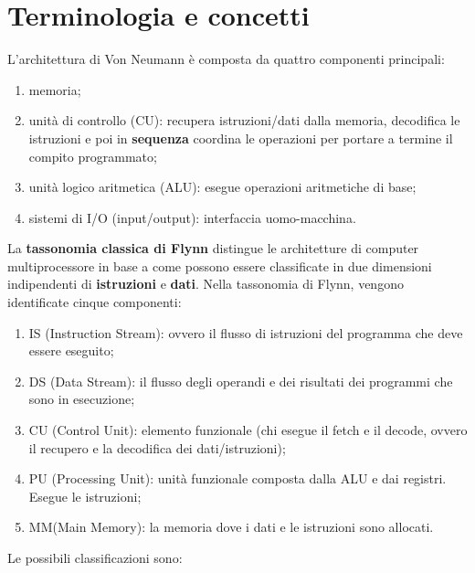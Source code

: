 \section{Terminologia e concetti}
L'architettura di Von Neumann è composta da quattro componenti principali:
\begin{enumerate}
	\item memoria;
	\item unità di controllo (CU): recupera istruzioni/dati dalla memoria, decodifica le istruzioni e poi in \textbf{sequenza} coordina le operazioni per portare a termine il compito programmato;
	\item unità logico aritmetica (ALU): esegue operazioni aritmetiche di base;
	\item sistemi di I/O (input/output): interfaccia uomo-macchina.
\end{enumerate}
La \textbf{tassonomia classica di Flynn} distingue le architetture di computer multiprocessore in base a come possono essere classificate in due dimensioni indipendenti di \textbf{istruzioni} e \textbf{dati}.
Nella tassonomia di Flynn, vengono identificate cinque componenti:
\begin{enumerate}
	\item IS (Instruction Stream): ovvero il flusso di istruzioni del programma che deve essere eseguito;
	\item DS (Data Stream): il flusso degli operandi e dei risultati dei programmi che sono in esecuzione;
	\item CU (Control Unit): elemento funzionale (chi esegue il fetch e il decode, ovvero il recupero e la decodifica dei dati/istruzioni);
	\item PU (Processing Unit): unità funzionale composta dalla ALU e dai registri. Esegue le istruzioni;
	\item MM(Main Memory): la memoria dove i dati e le istruzioni sono allocati.
\end{enumerate}
Le possibili classificazioni sono:
